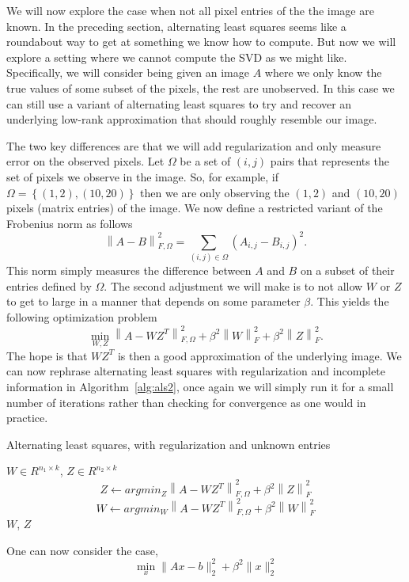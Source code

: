 \documentclass{article}
\begin{document}
We will now explore the case when not all pixel entries of the the image are known. In the preceding section, alternating least squares seems like a roundabout way to get at something we know how to compute. But now we will explore a setting where we cannot compute the SVD as we might like. Specifically, we will consider being given an image $A$ where we only know the true values of some subset of the pixels, the rest are unobserved. In this case we can still use a variant of alternating least squares to try and recover an underlying low-rank approximation that should roughly resemble our image. 

The two key differences are that we will add regularization and only measure error on the observed pixels. Let $\Omega$ be a set of $(i,j)$ pairs that represents the set of pixels we observe in the image. So, for example, if $\Omega = \left\{(1,2),(10,20)\right\}$ then we are only observing the $(1,2)$ and $(10,20)$ pixels (matrix entries) of the image. We now define a restricted variant of the Frobenius norm as follows
\[
\left\|A-B\right\|_{F,\Omega}^2 = \sum_{(i,j)\in \Omega} \left(A_{i,j}-B_{i,j}\right)^2.
\]
This norm simply measures the difference between $A$ and $B$ on a subset of their entries defined by $\Omega.$ The second adjustment we will make is to not allow $W$ or $Z$ to get to large in a manner that depends on some parameter $\beta.$ This yields the following optimization problem
\[
\min_{W,Z}\left\|A - WZ^T\right\|^2_{F,\Omega} + \beta^2\left\|W\right\|^2_F + \beta^2\left\|Z\right\|^2_F. 
\]
The hope is that $WZ^T$ is then a good approximation of the underlying image.
We can now rephrase alternating least squares with regularization and incomplete information in Algorithm~\ref{alg:als2}, once again we will simply run it for a small number of iterations rather than checking for convergence as one would in practice.
\begin{algorithm}
\caption{Alternating least squares, with regularization and unknown entries}
\label{alg:als2}
\begin{algorithmic}
 $W \in R^{n_1 \times k}$, $Z \in R^{n_2 \times k}$
  \State $$Z \leftarrow argmin_{Z}\left\|A - WZ^T\right\|^2_{F,\Omega} + \beta^2\left\|Z\right\|_F^2$$ 
  \State $$W \leftarrow argmin_{W}\left\|A - WZ^T\right\|^2_{F,\Omega} + \beta^2\left\|W\right\|_F^2$$
\EndWhile
{} $W$, $Z$
\end{algorithmic}
\end{algorithm}
One can now consider the case, 
$$\min_x \|Ax-b\|_2^2 + \beta^2 \|x\|_2^2$$   
\end{document}
